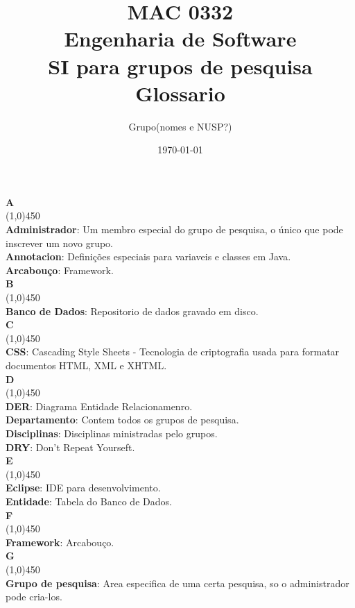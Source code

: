 \documentclass[11pt, a4paper]{article}
\title{MAC 0332\\
	Engenharia de Software\\
	SI para grupos de pesquisa\\
	Glossario}
\date{\today}
\author{Grupo(nomes e NUSP?)}
\begin{document}
	\maketitle
	\newpage

	\noindent\textbf{\huge{A}}\\
	\line(1,0){450}\\
	\textbf{Administrador}: Um membro especial do grupo de pesquisa, o único 
	que pode inscrever um novo grupo.\\
	\textbf{Annotacion}: Definições especiais para variaveis e 
	classes em Java.\\
	\textbf{Arcabouço}: Framework.\\
	
	\noindent\textbf{\huge{B}}\\
	\line(1,0){450}\\
	\textbf{Banco de Dados}: Repositorio de dados gravado em disco.\\

	\noindent\textbf{\huge{C}}\\
	\line(1,0){450}\\
	\textbf{CSS}: Cascading Style Sheets - Tecnologia de criptografia usada 
	para formatar documentos HTML, XML e XHTML.\\

	\noindent\textbf{\huge{D}}\\
	\line(1,0){450}\\
	\textbf{DER}: Diagrama Entidade Relacionamenro.\\
	\textbf{Departamento}: Contem todos os grupos de pesquisa.\\
	\textbf{Disciplinas}: Disciplinas ministradas pelo grupos.\\
	\textbf{DRY}: Don't Repeat Yourseft.\\
	
	\noindent\textbf{\huge{E}}\\
	\line(1,0){450}\\
	\textbf{Eclipse}: IDE para desenvolvimento.\\
	\textbf{Entidade}: Tabela do Banco de Dados.\\
	
	\noindent\textbf{\huge{F}}\\
	\line(1,0){450}\\
	\textbf{Framework}: Arcabouço.\\

	\noindent\textbf{\huge{G}}\\
	\line(1,0){450}\\
	\textbf{Grupo de pesquisa}: Area especifica de uma certa pesquisa, so o 
	administrador pode cria-los.\\
	
\end{document}
